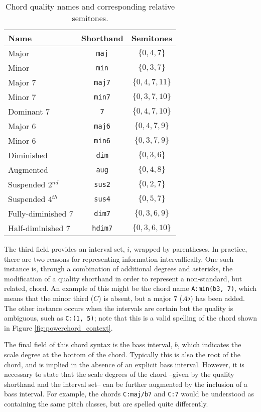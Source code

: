 \begin{table}[h]
\begin{center}
\caption{Chord quality names and corresponding relative semitones.}
\label{tab:qualities}
\begin{tabular}{l | c | c}
Name & Shorthand & Semitones \\
\hline
Major & \texttt{maj} & $\{0, 4, 7\}$ \\
Minor & \texttt{min} & $\{0, 3, 7\}$ \\
Major 7 & \texttt{maj7} & $\{0, 4, 7, 11\}$ \\
Minor 7 & \texttt{min7} & $\{0, 3, 7, 10\}$ \\
Dominant 7 & \texttt{7} & $\{0, 4, 7, 10\}$ \\
Major 6 & \texttt{maj6} & $\{0, 4, 7, 9\}$ \\
Minor 6 & \texttt{min6} & $\{0, 3, 7, 9\}$ \\
Diminished & \texttt{dim} & $\{0, 3, 6\}$ \\
Augmented & \texttt{aug} & $\{0, 4, 8\}$ \\
Suspended 2$^{nd}$ & \texttt{sus2} & $\{0, 2, 7\}$ \\
Suspended 4$^{th}$ & \texttt{sus4} & $\{0, 5, 7\}$ \\
Fully-diminished 7 & \texttt{dim7} & $\{0, 3, 6, 9\}$ \\
Half-diminished 7 & \texttt{hdim7} & $\{0, 3, 6, 10\}$ \\
\hline
\end{tabular}
\end{center}
\end{table}


The third field provides an interval set, $i$, wrapped by parentheses.
In practice, there are two reasons for representing information intervallically.
One such instance is, through a combination of additional degrees and asterisks, the modification of a quality shorthand in order to represent a non-standard, but related, chord.
An example of this might be the chord name \texttt{A:min(\*b3, 7)}, which means that the minor third ($C$) is absent, but a major 7 ($A\flat$) has been added.
The other instance occurs when the intervals are certain but the quality is ambiguous, such as \texttt{C:(1, 5)}; note that this is a valid spelling of the chord shown in Figure \ref{fig:powerchord_context}.

The final field of this chord syntax is the bass interval, $b$, which indicates the scale degree at the bottom of the chord.
Typically this is also the root of the chord, and is implied in the absence of an explicit bass interval.
However, it is necessary to state that the scale degrees of the chord --given by the quality shorthand and the interval set-- can be further augmented by the inclusion of a bass interval.
For example, the chords \texttt{C:maj/b7} and \texttt{C:7} would be understood as containing the same pitch classes, but are spelled quite differently.


